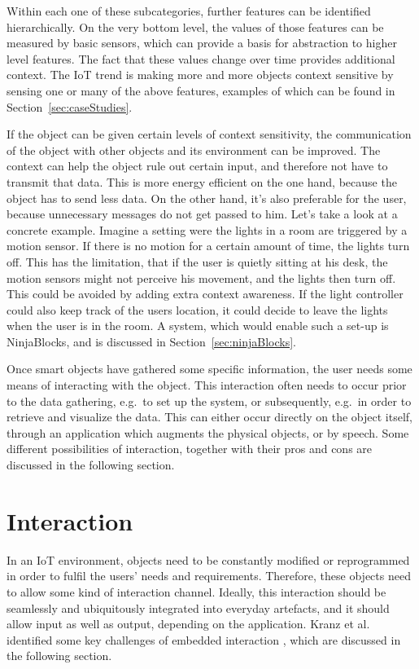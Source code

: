 Within each one of these subcategories, further features can be identified hierarchically. 
On the very bottom level, the values of those features can be measured by basic sensors, which can provide a basis for abstraction to higher level features. 
The fact that these values change over time provides additional context. 
The IoT trend is making more and more objects context sensitive by sensing one or many of the above features, examples of which can be found in Section~\ref{sec:caseStudies}.

If the object can be given certain levels of context sensitivity, the communication of the object with other objects and its environment can be improved.
The context can help the object rule out certain input, and therefore not have to transmit that data.
This is more energy efficient on the one hand, because the object has to send less data.
On the other hand, it's also preferable for the user, because unnecessary messages do not get passed to him.
Let's take a look at a concrete example.
Imagine a setting were the lights in a room are triggered by a motion sensor.
If there is no motion for a certain amount of time, the lights turn off.
This has the limitation, that if the user is quietly sitting at his desk, the motion sensors might not perceive his movement, and the lights then turn off.
This could be avoided by adding extra context awareness.
If the light controller could also keep track of the users location, it could decide to leave the lights when the user is in the room.
A system, which would enable such a set-up is NinjaBlocks, and is discussed in Section~\ref{sec:ninjaBlocks}.


Once smart objects have gathered some specific information, the user needs some means of interacting with the object.
This interaction often needs to occur prior to the data gathering, e.g.\ to set up the system, or subsequently, e.g.\ in order to retrieve and visualize the data. This can either occur directly on the object itself, through an application which augments the physical objects, or by speech.
Some different possibilities of interaction, together with their pros and cons are discussed in the following section.

\section{Interaction}
\label{sec:interaction}
In an IoT environment, objects need to be constantly modified or reprogrammed in order to fulfil the users' needs and requirements. 
Therefore, these objects need to allow some kind of interaction channel. 
Ideally, this interaction should be seamlessly and ubiquitously integrated into everyday artefacts, and it should allow input as well as output, depending on the application. 
Kranz et al. identified some key challenges of embedded interaction \cite{kranz10}, which are discussed in the following section.

